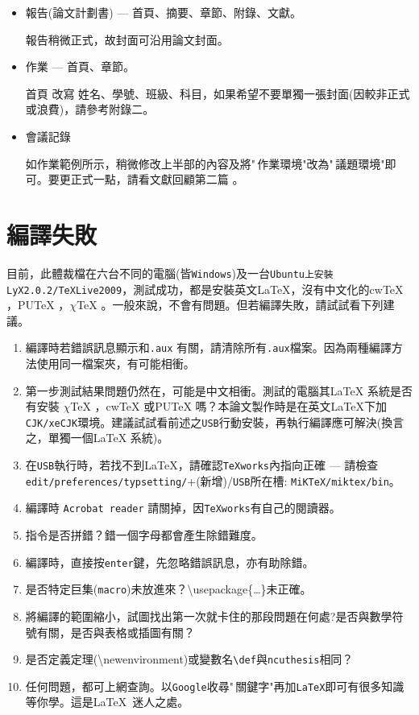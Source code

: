 \begin{itemize}
\item 報告(論文計劃書) --- 首頁、摘要、章節、附錄、文獻。

報告稍微正式，故封面可沿用論文封面。

\item 作業 --- 首頁、章節。

首頁 改寫 姓名、學號、班級、科目，如果希望不要單獨一張封面(因較非正式或浪費)，請參考附錄二。


\item 會議記錄

如作業範例所示，稍微修改上半部的內容及將"\,作業環境"改為"\,議題環境"即可。要更正式一點，請看文獻回顧第二篇
。
\end{itemize}

\section{編譯失敗}
目前，此體裁檔在六台不同的電腦(皆{\tt Windows})及一台{\tt Ubuntu上安裝LyX2.0.2/TeXLive2009}，測試成功，都是安裝英文\LaTeX{}，沒有中文化的cw\TeX{} ，PU\TeX{} ，$\chi$\TeX{} 。一般來說，不會有問題。但若編譯失敗，請試試看下列建議。

\begin{enumerate}
\item 編譯時若錯誤訊息顯示和{\tt .aux} 有關，請清除所有{\tt *.aux}檔案。因為兩種編譯方法使用同一檔案夾，有可能相衝。 
\item 第一步測試結果問題仍然在，可能是中文相衝。測試的電腦其\LaTeX{ }系統是否有安裝 $\chi$\TeX{} ，cw\TeX{} 或PU\TeX{} 嗎？本論文製作時是在英文\LaTeX{}下加 {\tt CJK/xeCJK}環境。建議試試看前述之{\tt USB}行動安裝，再執行編譯應可解決(換言之，單獨一個\LaTeX{} 系統)。
\item {\color{red} 在{\tt USB}執行時，若找不到\LaTeX{}，請確認{\tt TeXworks}內指向正確 --- 
請檢查{\tt edit/preferences/typsetting/}+(新增)/{\tt USB}所在槽: \hfil\break
{\tt MiKTeX/miktex/bin}}。
\item {\color{red}編譯時 {\tt Acrobat reader} 請關掉，因{\tt TeXworks}有自己的閱讀器。}
\item 指令是否拼錯？錯一個字母都會產生除錯難度。
\item 編譯時，直接按{\tt enter}鍵，先忽略錯誤訊息，亦有助除錯。
\item 是否特定巨集({\tt macro})未放進來？\textbackslash usepackage\{\ldots\}未正確。
\item 將編譯的範圍縮小，試圖找出第一次就卡住的那段問題在何處?是否與數學符號有關，是否與表格或插圖有關？
\item 是否定義定理(\textbackslash newenvironment)或變數名{\verb|\def|}與{\tt ncuthesis}相同？
\item 任何問題，都可上網查詢。以{\tt Google}收尋"\,關鍵字"再加{\tt LaTeX}即可有很多知識等你學。這是\LaTeX\ 迷人之處。
\end{enumerate}
